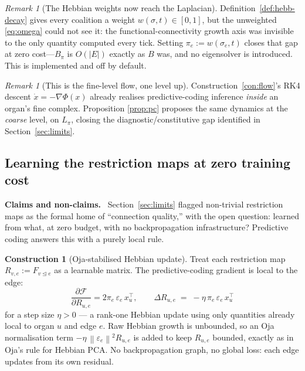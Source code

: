 \documentclass[11pt]{article}
\theoremstyle{definition}
\newtheorem{construction}[definition]{Construction}
\theoremstyle{plain}
\theoremstyle{remark}
\newtheorem{remark}[definition]{Remark}
\newcommand{\Hon}{\noindent\textbf{\color{honestycol}Claims and non-claims.}\ }
\newcommand{\rest}[1]{F_{#1}}
\newcommand{\norm}[1]{\left\lVert #1 \right\rVert}
\newcommand{\triang}{\trianglelefteq}
\begin{document}
\begin{remark}[The Hebbian weights now reach the Laplacian]\label{rem:hebbwired}
Definition~\ref{def:hebb-decay} gives every coalition a weight $w(\sigma,t)\in[0,1]$,
but the unweighted \eqref{eq:omega} could not see it: the functional-connectivity
growth axis was invisible to the only quantity computed every tick. Setting
$\pi_e:=w(\sigma_e,t)$ closes that gap at zero cost---$B_\pi$ is $O(|E|)$ exactly as
$B$ was, and no eigensolver is introduced. This is implemented and off by default.
\end{remark}

\begin{remark}[This is the fine-level flow, one level up]
Construction~\ref{con:flow}'s RK4 descent $\dot x=-\nabla\Phi(x)$ already realises
predictive-coding inference \emph{inside} an organ's fine complex. Proposition
\ref{prop:pc} proposes the same dynamics at the \emph{coarse} level, on $L_\pi$,
closing the diagnostic/constitutive gap identified in Section~\ref{sec:limits}.
\end{remark}

\subsection{Learning the restriction maps at zero training cost}

\begin{hon}\Hon
Section~\ref{sec:limits} flagged non-trivial restriction maps as the formal home of
``connection quality,'' with the open question: learned from what, at zero budget,
with no backpropagation infrastructure? Predictive coding answers this with a purely
local rule.
\end{hon}

\begin{construction}[Oja-stabilised Hebbian update]\label{con:hebb}
Treat each restriction map $R_{v,e}:=\rest{v\triang e}$ as a learnable matrix. The
predictive-coding gradient is local to the edge:
\begin{equation}\label{eq:hebb}
\frac{\partial \mathcal F}{\partial R_{u,e}} = 2\pi_e\,\varepsilon_e\,x_u^{\top},
\qquad
\Delta R_{u,e} \;=\; -\eta\,\pi_e\,\varepsilon_e\,x_u^{\top}
\end{equation}
for a step size $\eta>0$ — a rank-one Hebbian update using only quantities already
local to organ $u$ and edge $e$. Raw Hebbian growth is unbounded, so an Oja
normalisation term $-\eta\,\norm{\varepsilon_e}^2 R_{u,e}$ is added to keep
$R_{u,e}$ bounded, exactly as in Oja's rule for Hebbian PCA. No backpropagation
graph, no global loss: each edge updates from its own residual.
\end{construction}
\end{document}
